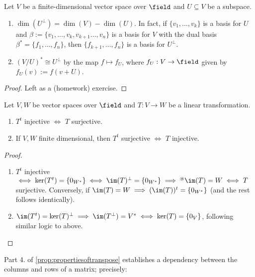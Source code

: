 \begin{theorem}
    Let $V$ be a finite-dimensional vector space over $\field$ and $U \subseteq V$ be a subspace. \begin{enumerate}
        \item $\dim(U^\perp) = \dim(V) - \dim(U)$. In fact, if $\{v_1, \dots, v_k\}$ is a basis for $U$ and $\beta := \{v_1, \dots, v_k, v_{k+1} \dots, v_n\}$ is a basis for $V$ with the dual basis $\beta^\ast = \{f_1, \dots, f_n\}$, then $\{f_{k+1}, \dots, f_n\}$ is a basis for $U^\perp$.
        \item $(V/U)^\ast \cong U^\perp$ by the map $f \mapsto f_U$, where $f_U:V \to \field$ given by $f_U(v) := f(v + U)$.
    \end{enumerate}
\end{theorem}
\begin{proof}
    Left as a (homework) exercise.



\end{proof}

\begin{corollary}
    Let $V, W$ be vector spaces over $\field$ and $T: V \to W$ be a linear transformation.
    \begin{enumerate}
        \item $T^t$ injective $\iff$ $T$ surjective.
        \item If $V, W$ finite dimensional, then $T^t$ surjective $\iff$ $T$ injective.
    \end{enumerate}
\end{corollary}

\begin{proof}
    \begin{enumerate}
        \item $T^t$ injective $\iff \ker(T^t) = \{0_{W^\ast}\} \iff \im(T)^\perp = \{0_{W^\ast}\}\implies^{\circledast}\im(T) = W \iff T$ surjective. Conversely, if $\im(T) = W \implies (\im(T))^t = \{0_{W^\ast}\}$ (and the rest follows identically).
        \item $\im(T^t) = \ker(T)^\perp \implies \im(T^\perp) = V^\ast \iff \ker(T) = \{0_V\}$, following similar logic to above.
    \end{enumerate}
\end{proof}

\begin{remark}
    Part 4. of \cref{prop:propertiesoftranspose} establishes a dependency between the columns and rows of a matrix; precisely:
\end{remark}
